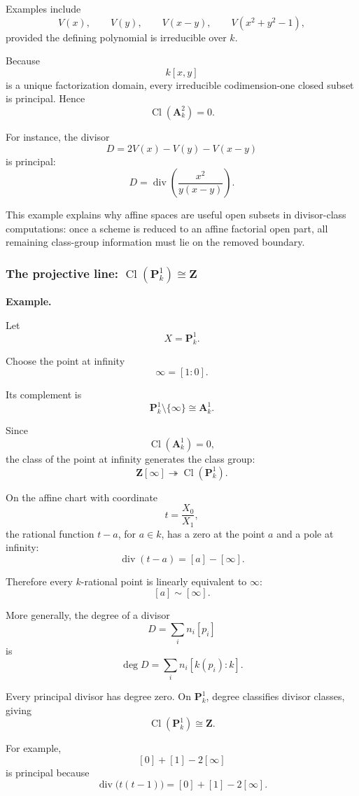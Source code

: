 Examples include
\[
V(x),\qquad
V(y),\qquad
V(x-y),\qquad
V(x^2+y^2-1),
\]
provided the defining polynomial is irreducible over \(k\).

Because
\[
k[x,y]
\]
is a unique factorization domain, every irreducible codimension-one closed subset is principal. Hence
\[
\boxed{
	\operatorname{Cl}(\mathbf A^2_k)=0.
}
\]

For instance, the divisor
\[
D=2V(x)-V(y)-V(x-y)
\]
is principal:
\[
D
=
\operatorname{div}\left(\frac{x^2}{y(x-y)}\right).
\]

This example explains why affine spaces are useful open subsets in divisor-class computations: once a scheme is reduced to an affine factorial open part, all remaining class-group information must lie on the removed boundary.

\subsubsection{\texorpdfstring{The projective line: \(\operatorname{Cl}(\mathbf P^1_k)\cong \mathbf Z\)}{The projective line}}

\textbf{Example.}

Let
\[
X=\mathbf P^1_k.
\]

Choose the point at infinity
\[
\infty=[1:0].
\]

Its complement is
\[
\mathbf P^1_k\setminus\{\infty\}\cong\mathbf A^1_k.
\]

Since
\[
\operatorname{Cl}(\mathbf A^1_k)=0,
\]
the class of the point at infinity generates the class group:
\[
\mathbf Z[\infty]\twoheadrightarrow\operatorname{Cl}(\mathbf P^1_k).
\]

On the affine chart with coordinate
\[
t=\frac{X_0}{X_1},
\]
the rational function \(t-a\), for \(a\in k\), has a zero at the point \(a\) and a pole at infinity:
\[
\operatorname{div}(t-a)
=
[a]-[\infty].
\]

Therefore every \(k\)-rational point is linearly equivalent to \(\infty\):
\[
[a]\sim[\infty].
\]

More generally, the degree of a divisor
\[
D=\sum_i n_i[p_i]
\]
is
\[
\deg D=\sum_i n_i[k(p_i):k].
\]

Every principal divisor has degree zero. On \(\mathbf P^1_k\), degree classifies divisor classes, giving
\[
\boxed{
	\operatorname{Cl}(\mathbf P^1_k)\cong\mathbf Z.
}
\]

For example,
\[
[0]+[1]-2[\infty]
\]
is principal because
\[
\operatorname{div}\bigl(t(t-1)\bigr)
=
[0]+[1]-2[\infty].
\]

